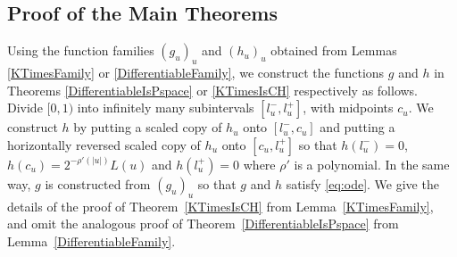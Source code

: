 \subsection{Proof of the Main Theorems}
\label{subsection: proof of theorems}
Using the function families $(g_u)_u$ and $(h_u)_u$ 
obtained from Lemmas \ref{KTimesFamily} or \ref{DifferentiableFamily}, 
we construct the functions $g$ and $h$ in 
Theorems \ref{DifferentiableIsPspace} or \ref{KTimesIsCH} respectively as follows. 
Divide $[0,1)$ into infinitely many subintervals $[l^-_u, l^+_u]$,
with midpoints $c_u$.
We construct $h$ by putting a scaled copy of $h_u$ onto $[l^-_u, c_u]$ and
putting a horizontally reversed scaled copy of $h_u$ onto $[c_u, l^+_u]$ 
so that $h(l^-_u) = 0$, $h(c_u) = 2^{-\rho'(|u|)} L(u)$ and $h(l^+_u) = 0$ where $\rho'$ is a polynomial.
In the same way, $g$ is constructed from $(g_u)_u$ so that $g$ and $h$ satisfy \eqref{eq:ode}.
We give the details of the proof of 
Theorem~\ref{KTimesIsCH} from Lemma~\ref{KTimesFamily}, 
and omit the analogous proof of Theorem~\ref{DifferentiableIsPspace} 
from Lemma~\ref{DifferentiableFamily}. 


